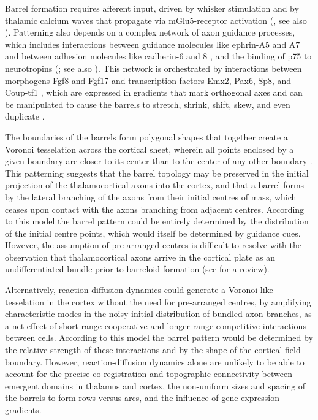 \documentclass[a4paper,11pt]{article}
\begin{document}
Barrel formation requires afferent input, driven by whisker stimulation and by
thalamic calcium waves that propagate via mGlu5-receptor activation
(\citealp{anton-bolanos_prenatal_2019}, see also \citealp{anton-bolanos_developmental_2018}). Patterning also depends
on a complex network of axon guidance processes, which includes interactions
between guidance molecules like ephrin-A5 and A7 \citep{miller_epha7-ephrin-a5_2006} and
between adhesion molecules like cadherin-6 and 8 \citep{greig_molecular_2013,bishop_regulation_2000},
and the binding of p75 to neurotropins (\citealp{shimogori_fibroblast_2005,bishop_distinct_2002};
see also \citealp{dye_lifespan_2011,dye_lifespan_2011-1}). This network is orchestrated by
interactions between morphogens Fgf8 and Fgf17 and transcription factors Emx2,
Pax6, Sp8, and Coup-tf1 \citep{shimogori_fibroblast_2005,bishop_regulation_2000}, which are expressed
in gradients that mark orthogonal axes and can be manipulated to cause the
barrels to stretch, shrink, shift, skew, and even duplicate
\citep{shimogori_fibroblast_2005,assimacopoulos_fibroblast_2012,borello_sp8_2014,sahara_sp8_2007,ypsilanti_transcriptional_2016,sur_patterning_2005}.

The boundaries of the barrels form polygonal shapes that together
create a Voronoi tesselation across the cortical sheet, wherein all
points enclosed by a given boundary are closer to its center than to
the center of any other boundary \citep{senft_mouse_1991}. This
patterning suggests that the barrel topology may be preserved in the
initial projection of the thalamocortical axons into the cortex, and
that a barrel forms by the lateral branching of the axons from their
initial centres of mass, which ceases upon contact with the axons
branching from adjacent centres. According to this model the barrel
pattern could be entirely determined by the distribution of the
initial centre points, which would itself be determined by guidance
cues. However, the assumption of pre-arranged centres is difficult to
resolve with the observation that thalamocortical axons arrive in the
cortical plate as an undifferentiated bundle prior to barreloid
formation (see \citealp{erzurumlu_development_2012} for a review).

Alternatively, reaction-diffusion dynamics could generate a Voronoi-like
tesselation in the cortex without the need for pre-arranged centres, by
amplifying characteristic modes in the noisy initial distribution of bundled
axon branches, as a net effect of short-range cooperative and longer-range
competitive interactions between cells. According to this model the barrel
pattern would be determined by the relative strength of these interactions and
by the shape of the cortical field boundary. However, reaction-diffusion
dynamics alone are unlikely to be able to account for the precise
co-registration and topographic connectivity between emergent domains in
thalamus and cortex, the non-uniform sizes and spacing of the barrels to form
rows versus arcs, and the influence of gene expression gradients.
\end{document}

